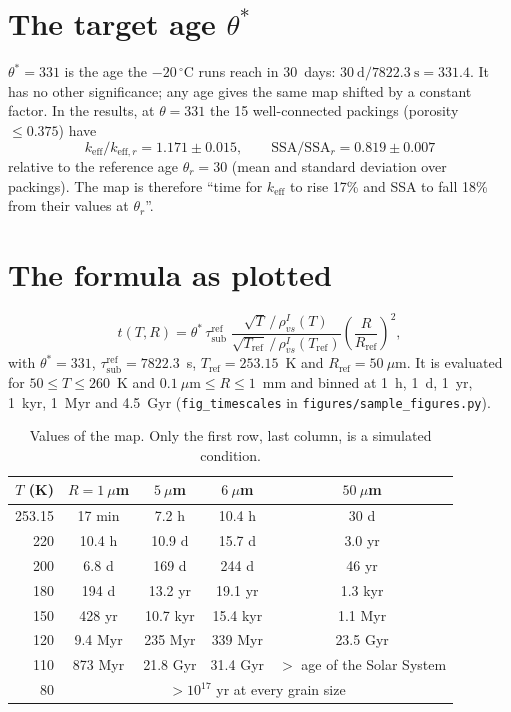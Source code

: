 \documentclass[11pt]{article}
\newcommand{\degC}{\,^{\circ}\mathrm{C}}
\newcommand{\taus}{\tau_{\mathrm{sub}}}
\newcommand{\rvs}{\rho_{vs}^{I}}
\begin{document}
\section{The target age $\theta^{*}$}

$\theta^{*} = 331$ is the age the $-20\degC$ runs reach in 30~days:
$30~\mathrm{d}/7822.3~\mathrm{s} = 331.4$. It has no other significance; any
age gives the same map shifted by a constant factor. In the results, at
$\theta = 331$ the 15 well-connected packings (porosity $\le 0.375$) have
\[
  k_{\mathrm{eff}}/k_{\mathrm{eff},r} = 1.171 \pm 0.015, \qquad
  \mathrm{SSA}/\mathrm{SSA}_r = 0.819 \pm 0.007
\]
relative to the reference age $\theta_r = 30$ (mean and standard deviation over
packings). The map is therefore ``time for $k_{\mathrm{eff}}$ to rise 17\% and
SSA to fall 18\% from their values at $\theta_r$''.

\section{The formula as plotted}

\begin{equation}
  t(T,R) = \theta^{*}\,\taus^{\mathrm{ref}}\;
     \frac{\sqrt{T}\,/\,\rvs(T)}{\sqrt{T_{\mathrm{ref}}}\,/\,\rvs(T_{\mathrm{ref}})}
     \left(\frac{R}{R_{\mathrm{ref}}}\right)^{2},
\end{equation}
with $\theta^{*}=331$, $\taus^{\mathrm{ref}}=7822.3$~s,
$T_{\mathrm{ref}}=253.15$~K and $R_{\mathrm{ref}}=50~\mu$m.
It is evaluated for $50 \le T \le 260$~K and
$0.1~\mu\mathrm{m} \le R \le 1$~mm and binned at 1~h, 1~d, 1~yr, 1~kyr, 1~Myr
and 4.5~Gyr (\texttt{fig\_timescales} in \texttt{figures/sample\_figures.py}).

\begin{table}[h]\centering
\caption{Values of the map. Only the first row, last column, is a simulated
condition.}\label{tab:values}
\begin{tabular}{rcccc}\toprule
$T$ (K) & $R = 1~\mu$m & $5~\mu$m & $6~\mu$m & $50~\mu$m\\\midrule
253.15 & 17 min & 7.2 h & 10.4 h & 30 d\\
220 & 10.4 h & 10.9 d & 15.7 d & 3.0 yr\\
200 & 6.8 d & 169 d & 244 d & 46 yr\\
180 & 194 d & 13.2 yr & 19.1 yr & 1.3 kyr\\
150 & 428 yr & 10.7 kyr & 15.4 kyr & 1.1 Myr\\
120 & 9.4 Myr & 235 Myr & 339 Myr & 23.5 Gyr\\
110 & 873 Myr & 21.8 Gyr & 31.4 Gyr & $>$ age of the Solar System\\
80 & \multicolumn{4}{c}{$> 10^{17}$ yr at every grain size}\\\bottomrule
\end{tabular}\end{table}
\end{document}
